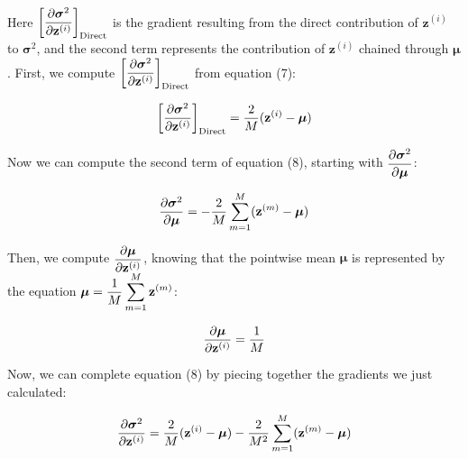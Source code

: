 \documentclass{article}
\begin{document}
\begin{multicols}{2}
Here $\begin{aligned}
    \bigg[{\partial \boldsymbol{\sigma}^2 \over \partial \textbf{z}^{(i)}} \bigg]_{\text{Direct}}
\end{aligned}$ is the gradient resulting from the direct contribution of
$\textbf{z}^{(i)}$ to $\boldsymbol{\sigma}^2$, and the second term represents
the contribution of $\textbf{z}^{(i)}$ chained through $\boldsymbol{\mu}$.
First, we compute $\begin{aligned}
    \bigg[{\partial \boldsymbol{\sigma}^2 \over \partial \textbf{z}^{(i)}} \bigg]_{\text{Direct}}
\end{aligned}$ from equation (7):

\begin{equation}
    \bigg[{\partial \boldsymbol{\sigma}^2 \over \partial \textbf{z}^{(i)}} \bigg]_{\text{Direct}} =
    {2 \over M} (\textbf{z}^{(i)} - \boldsymbol{\mu}) \notag
\end{equation}

Now we can compute the second term of equation (8), starting with 
$\begin{aligned}
    {\partial \boldsymbol{\sigma}^2 \over \partial \boldsymbol{\mu}}
\end{aligned}$:

\begin{equation}
    {\partial \boldsymbol{\sigma}^2 \over \partial \boldsymbol{\mu}} = 
    -{2 \over M} \sum_{m=1}^M (\textbf{z}^{(m)} - \boldsymbol{\mu}) \notag
\end{equation}

Then, we compute $\begin{aligned}
    {\partial \boldsymbol{\mu} \over \partial \textbf{z}^{(i)}}
\end{aligned}$, knowing that the pointwise mean $\boldsymbol{\mu}$ is represented by the equation $\begin{aligned}
    \boldsymbol{\mu} = {1\over M} \sum_{m=1}^M\textbf{z}^{(m)}
\end{aligned}$:

\begin{equation}
    {\partial \boldsymbol{\mu} \over \partial \textbf{z}^{(i)}} = 
    {1\over M} 
\end{equation}

Now, we can complete equation (8) by piecing together the gradients 
we just calculated:

\begin{equation}
    {\partial \boldsymbol{\sigma}^2 \over \partial \textbf{z}^{(i)}} = 
    {2 \over M} (\textbf{z}^{(i)} - \boldsymbol{\mu})
    -{2 \over M^2} \sum_{m=1}^M (\textbf{z}^{(m)} - \boldsymbol{\mu}) \notag
\end{equation}


\end{multicols}
\end{document}
